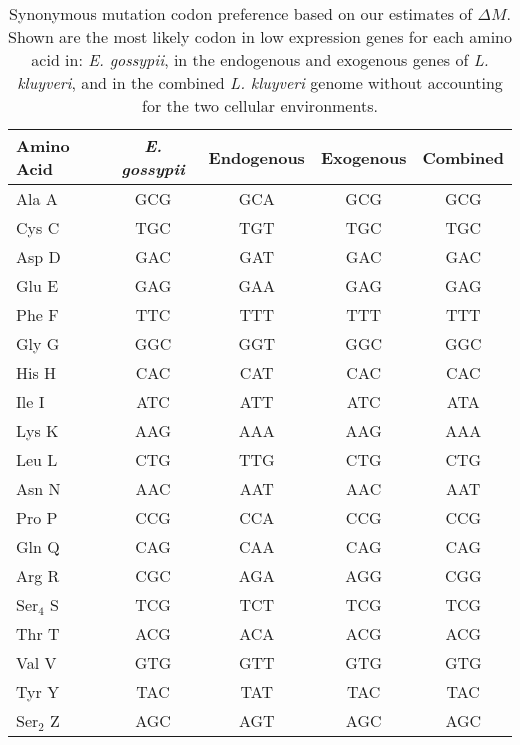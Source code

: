 \documentclass[doublespacing,linenumbers]{bmcart}
\newcommand{\kluyveri}{\textit{L. kluyveri}\xspace}
\newcommand{\gossypii}{\textit{E. gossypii}\xspace}
\newcommand{\DM}{\ensuremath{{\Delta M}}\xspace}
\begin{document}
\begin{backmatter}
\begin{table}[h]
    \centering
    \caption{Synonymous mutation codon preference based on our estimates of $\DM$.
	 Shown are the most likely codon in low expression genes for each amino acid in: \gossypii, in the endogenous and exogenous genes of \kluyveri, and in the combined \kluyveri genome without accounting for the two cellular environments.}
\begin{tabular}{  l  c  c  c  c  }
\hline
	Amino Acid & \gossypii & Endogenous & Exogenous & Combined \\ \hline
	Ala A & GCG & GCA & GCG & GCG \\ 
	Cys C & TGC & TGT & TGC & TGC \\ 
	Asp D & GAC & GAT & GAC & GAC \\ 
	Glu E & GAG & GAA & GAG & GAG \\ 
	Phe F & TTC & TTT & TTT & TTT \\ 
	Gly G & GGC & GGT & GGC & GGC \\ 
	His H & CAC & CAT & CAC & CAC \\ 
	Ile I & ATC & ATT & ATC & ATA \\ 
	Lys K & AAG & AAA & AAG & AAA \\ 
	Leu L & CTG & TTG & CTG & CTG \\ 
	Asn N & AAC & AAT & AAC & AAT \\ 
	Pro P & CCG & CCA & CCG & CCG \\ 
	Gln Q & CAG & CAA & CAG & CAG \\ 
	Arg R & CGC & AGA & AGG & CGG \\ 
	Ser$_4$ S & TCG & TCT & TCG & TCG \\
	Thr T & ACG & ACA & ACG & ACG \\ 
	Val V & GTG & GTT & GTG & GTG \\ 
	Tyr Y & TAC & TAT & TAC & TAC \\ 
	Ser$_2$ Z & AGC & AGT & AGC & AGC \\ \hline
\end{tabular}
    \label{tab:codon_pref_dm}
\end{table}

\clearpage


\end{backmatter}
\end{document}
